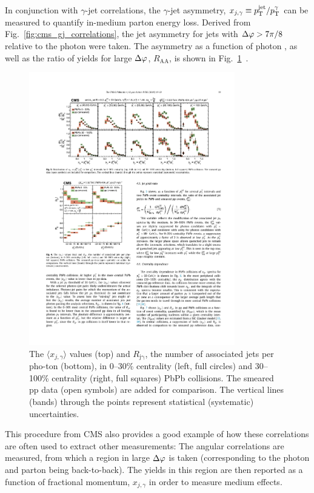 In conjunction with $\gamma$-jet correlations, the $\gamma$-jet asymmetry, $x_{j,\gamma}\equiv p_{\mathrm{T}}^\mathrm{jet}/p_{\mathrm{T}}^\gamma$ can be measured to quantify in-medium parton energy loss. Derived from Fig.~\ref{fig:cms_gj_correlations}, the jet asymmetry for jets with $\Delta\varphi > 7\pi/8$ relative to the photon were taken. The asymmetry as a function of photon \pt, as well as the ratio of yields for large $\Delta\varphi$, $R_\mathrm{AA}$, is shown in Fig.~\ref{fig:cms_gj_quenching.pdf}~\cite{Sirunyan2018}.

\begin{figure}[htpb]
  \centering
  \includegraphics[width=0.8\textwidth]{Introduction/cms_gj_quenching.pdf}
  \caption{The $\langle x_{j,\gamma} \rangle$ values (top) and $R_\mathrm{j\gamma}$, the number of associated jets per pho-ton (bottom), in 0–30\% centrality (left, full circles) and 30–100\% centrality (right, full squares) PbPb collisions. The smeared pp data (open symbols) are added for comparison. The vertical lines (bands) through the points represent statistical (systematic) uncertainties.}
  \label{fig:cms_gj_quenching.pdf}
\end{figure}

This procedure from CMS also provides a good example of how these correlations are often used to extract other measurements: The angular correlations are measured, from which a region in large $\Delta\varphi$ is taken (corresponding to the photon and parton being back-to-back). The yields in this region are then reported as a function of fractional momentum, $x_{j,\gamma}$ in order to measure medium effects.

